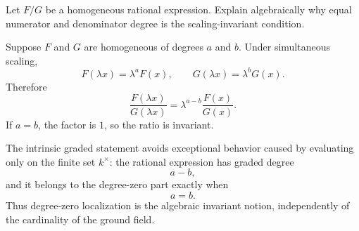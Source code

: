 \begin{problem}\label{prob:vi34-11}
Let \(F/G\) be a homogeneous rational expression. Explain algebraically why equal numerator and denominator degree is the scaling-invariant condition.
\end{problem}

\ifdefined\FullProblemDossiers
\begin{solution}
Suppose \(F\) and \(G\) are homogeneous of degrees \(a\) and \(b\). Under simultaneous scaling,
\[
F(\lambda x)=\lambda^aF(x),
\qquad
G(\lambda x)=\lambda^bG(x).
\]
Therefore
\[
\frac{F(\lambda x)}{G(\lambda x)}
=
\lambda^{a-b}\frac{F(x)}{G(x)}.
\]
If \(a=b\), the factor is \(1\), so the ratio is invariant.

The intrinsic graded statement avoids exceptional behavior caused by evaluating only on the finite set \(k^\times\):
the rational expression has graded degree
\[
a-b,
\]
and it belongs to the degree-zero part exactly when
\[
\boxed{a=b}.
\]
Thus degree-zero localization is the algebraic invariant notion, independently of the cardinality of the ground
field.
\end{solution}
\fi
